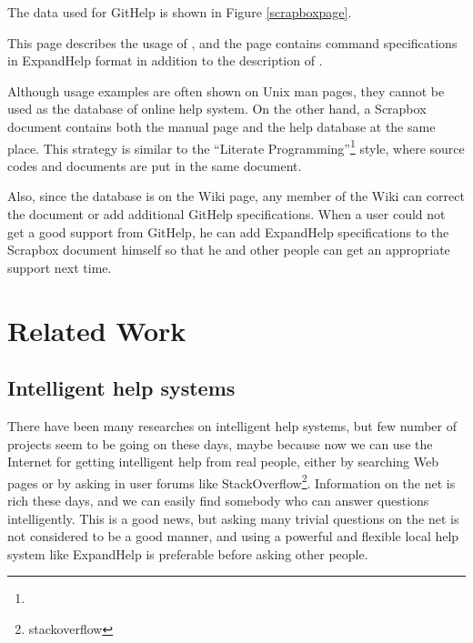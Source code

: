 \documentclass{sigchi}
\def\GH{\textsf{GitHelp}}
\def\SB{\textsf{Scrapbox}}
\def\EH{\textsf{ExpandHelp}}
\begin{document}
The data used for {\GH} is shown in Figure \ref{scrapboxpage}.


This page describes the usage of , and
the page contains command specifications in {\EH} format
in addition to the description of .
%

Although usage examples are often shown on Unix man pages,
they cannot be used as the database of online help system.
On the other hand,
a {\SB} document contains both the manual page and the help database
at the same place.
%
This strategy is similar to the
``Literate Programming''\footnote{
} style,
where source codes and documents are put in the same document.

Also, since the database is on the Wiki page, any member of the
Wiki can correct the document or add additional {\GH} specifications.
When a user could not get a good support from {\GH}, he can add
{\EH} specifications to the {\SB} document himself
so that he and other people can get an appropriate support next time.

\section{Related Work}

\subsection{Intelligent help systems}

There have been many researches on intelligent help systems\cite{Delisle:2002:UIH:606412.606415},
but few number of projects seem to be going on these days,
maybe because now we can use the Internet for getting intelligent help from
real people,
either by searching Web pages or 
by asking in user forums like StackOverflow\footnote{stackoverflow}.
Information on the net is rich these days, and we can easily
find somebody who can answer questions intelligently.
This is a good news, but 
asking many trivial questions on the net is not considered to be a
good manner, and
using a powerful and flexible local help system like {\EH} is
preferable before asking other people.
\end{document}
